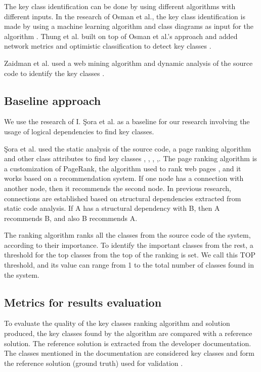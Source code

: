 \documentclass[runningheads]{comsis2}
\begin{document}
The key class identification can be done by using different algorithms with different inputs. In the research of Osman et al., the key class identification is made by using a machine learning algorithm and class diagrams as input for the algorithm \cite{6676885}. Thung et al. built on top of Osman et al.’s approach and added network metrics and optimistic classification to detect key classes \cite{rocclasification}.

Zaidman et al. used a web mining algorithm and dynamic analysis of the source code to identify the key classes \cite{ZaidmanJurnal}.

\subsection{Baseline approach}
\label{sec:baseline_approach_sub}
We use the research of I. Şora et al. \cite{Finding-key-classes} as a baseline for our research involving the usage of logical dependencies to find key classes. 

Şora et al. used the static analysis of the source code, a page ranking algorithm and other class attributes to find key classes \cite{PagerankENASE}, \cite{enase15}, \cite{SoraSpringer}, \cite{PagerankSACI},\cite{Finding-key-classes}.
The page ranking algorithm is a customization of PageRank, the algorithm used to rank web pages \cite{ilprints422}, and it works based on a recommendation system. If one node has a connection with another node, then it recommends the second node. In previous research, connections are established based on structural dependencies extracted from static code analysis. If A has a structural dependency with B, then A recommends B, and also B recommends A.

The ranking algorithm ranks all the classes from the source code of the system, according to their importance. To identify the important classes from the rest, a threshold for the top classes from the top of the ranking is set. We call this TOP threshold, and its value can range from 1 to the total number of classes found in the system. 

\subsection{Metrics for results evaluation}
\label{sec:evalmetrics}
To evaluate the quality of the key classes ranking algorithm and solution produced, the key classes found by the algorithm are compared with a reference solution. The reference solution is extracted from the developer documentation. The classes mentioned in the documentation are considered key classes and form the reference solution (ground truth) used for validation \cite{7551990}.
\end{document}
